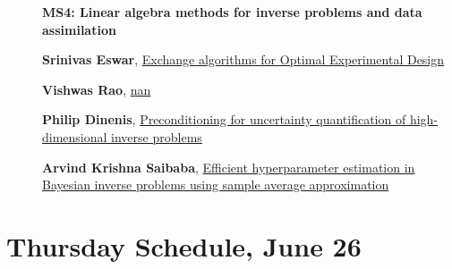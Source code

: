 \documentclass[ILAS2025-program.tex]{subfiles}
\begin{document}
    \begin{description}
    \item[] {\color{mstitle}\textbf{MS4: Linear algebra methods for inverse problems and data assimilation}} 
    \item[] \hypertarget{up0355}{}\textbf{Srinivas Eswar}, \hyperlink{down0355}{Exchange algorithms for Optimal Experimental Design
}
        \item[] \hypertarget{up0356}{}\textbf{Vishwas Rao}, \hyperlink{down0356}{nan}
        \item[] \hypertarget{up0357}{}\textbf{Philip Dinenis}, \hyperlink{down0357}{Preconditioning for uncertainty quantification of high-dimensional inverse problems}
        \item[] \hypertarget{up0358}{}\textbf{Arvind Krishna Saibaba}, \hyperlink{down0358}{Efficient hyperparameter estimation in Bayesian inverse problems using sample average approximation
}
        \end{description}
    \newpage

\section*{Thursday Schedule, June 26 }
        
\end{document}
